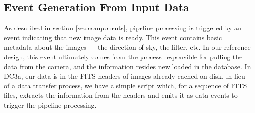 \subsection{Event Generation From Input Data}

As described in section \ref{sec:components}, pipeline processing is
triggered by an event indicating that new image data is
ready.  This event contains basic metadata about the images --- the
direction of sky, the filter, etc.  In our reference design, this
event ultimately comes from the process responsible for pulling the
data from the camera, and the information resides new loaded in the
database.  In DC3a, our data is in the FITS headers of images
already cached on disk.  In lieu of a data transfer process, we have a
simple script which, for a sequence of FITS files, extracts the
information from the headers and emits it as data events to trigger
the pipeline processing.

